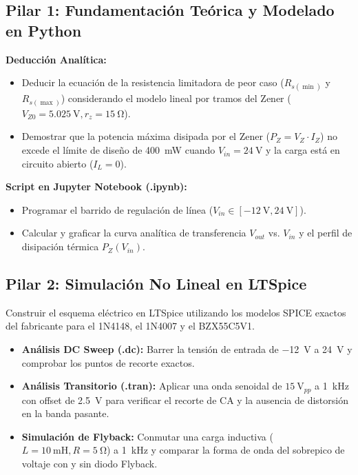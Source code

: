 \documentclass[11pt, a4paper]{article}
\begin{document}
\subsection*{Pilar 1: Fundamentación Teórica y Modelado en Python}
\textbf{Deducción Analítica:}
\begin{itemize}
    \item Deducir la ecuación de la resistencia limitadora de peor caso ($R_{s(\min)}$ y $R_{s(\max)}$) considerando el modelo lineal por tramos del Zener ($V_{Z0} = \qty{5.025}{\volt}, r_z = \qty{15}{\ohm}$).
    \item Demostrar que la potencia máxima disipada por el Zener ($P_Z = V_Z \cdot I_Z$) no excede el límite de diseño de \qty{400}{\milli\watt} cuando $V_{in} = \qty{+24}{\volt}$ y la carga está en circuito abierto ($I_L = 0$).
\end{itemize}
\textbf{Script en Jupyter Notebook (.ipynb):}
\begin{itemize}
    \item Programar el barrido de regulación de línea ($V_{in} \in [\qty{-12}{\volt}, \qty{+24}{\volt}]$).
    \item Calcular y graficar la curva analítica de transferencia $V_{out}$ vs. $V_{in}$ y el perfil de disipación térmica $P_Z(V_{in})$.
\end{itemize}

\subsection*{Pilar 2: Simulación No Lineal en LTSpice}
Construir el esquema eléctrico en LTSpice utilizando los modelos SPICE exactos del fabricante para el 1N4148, el 1N4007 y el BZX55C5V1.
\begin{itemize}
    \item \textbf{Análisis DC Sweep (.dc):} Barrer la tensión de entrada de \qty{-12}{\volt} a \qty{+24}{\volt} y comprobar los puntos de recorte exactos.
    \item \textbf{Análisis Transitorio (.tran):} Aplicar una onda senoidal de $\qty{15}{\volt_{pp}}$ a \qty{1}{\kilo\hertz} con offset de \qty{+2.5}{\volt} para verificar el recorte de CA y la ausencia de distorsión en la banda pasante.
    \item \textbf{Simulación de Flyback:} Conmutar una carga inductiva ($L = \qty{10}{\milli\henry}, R = \qty{5}{\ohm}$) a \qty{1}{\kilo\hertz} y comparar la forma de onda del sobrepico de voltaje con y sin diodo Flyback.
\end{itemize}
\end{document}
